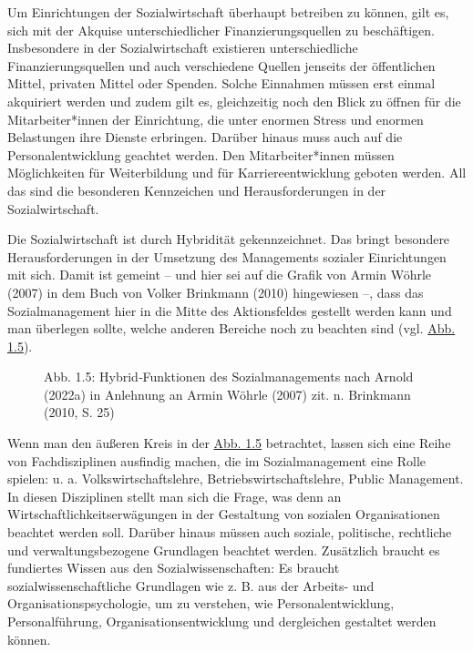 \documentclass[
  letterpaper,
]{book}
\makeatletter
\newcommand*\pandocbounded[1]{%
  \sbox\pandoc@box{#1}%
  \Gscale@div\@tempa{\textheight}{\dimexpr\ht\pandoc@box+\dp\pandoc@box\relax}%
  \Gscale@div\@tempb{\linewidth}{\wd\pandoc@box}%
  \ifdim\@tempb\p@<\@tempa\p@\let\@tempa\@tempb\fi%
  \ifdim\@tempa\p@<\p@\scalebox{\@tempa}{\usebox\pandoc@box}%
  \else\usebox{\pandoc@box}%
  \fi%
}
\makeatother
\begin{document}
Um Einrichtungen der Sozialwirtschaft überhaupt betreiben zu können,
gilt es, sich mit der Akquise unterschiedlicher Finanzierungsquellen zu
beschäftigen. Insbesondere in der Sozialwirtschaft existieren
unterschiedliche Finanzierungsquellen und auch verschiedene Quellen
jenseits der öffentlichen Mittel, privaten Mittel oder Spenden. Solche
Einnahmen müssen erst einmal akquiriert werden und zudem gilt es,
gleichzeitig noch den Blick zu öffnen für die Mitarbeiter*innen der
Einrichtung, die unter enormen Stress und enormen Belastungen ihre
Dienste erbringen. Darüber hinaus muss auch auf die Personalentwicklung
geachtet werden. Den Mitarbeiter*innen müssen Möglichkeiten für
Weiterbildung und für Karriereentwicklung geboten werden. All das sind
die besonderen Kennzeichen und Herausforderungen in der
Sozialwirtschaft.

Die Sozialwirtschaft ist durch Hybridität gekennzeichnet. Das bringt
besondere Herausforderungen in der Umsetzung des Managements sozialer
Einrichtungen mit sich. Damit ist gemeint -- und hier sei auf die Grafik
von Armin Wöhrle (2007) in dem Buch von Volker Brinkmann (2010)
hingewiesen --, dass das Sozialmanagement hier in die Mitte des
Aktionsfeldes gestellt werden kann und man überlegen sollte, welche
anderen Bereiche noch zu beachten sind (vgl. \hyperref[figure15]{Abb.
1.5}).

\begin{figure}

\pandocbounded{\texttt{[image: images/figure15.png]}} \hfill{}

\caption{Abb. 1.5: Hybrid‐Funktionen des Sozialmanagements nach Arnold
(2022a) in Anlehnung an Armin Wöhrle (2007) zit. n. Brinkmann (2010, S.
25)}

\end{figure}%

Wenn man den äußeren Kreis in der \hyperref[figure15]{Abb. 1.5}
betrachtet, lassen sich eine Reihe von Fachdisziplinen ausfindig machen,
die im Sozialmanagement eine Rolle spielen: u. a. Volkswirtschaftslehre,
Betriebswirtschaftslehre, Public Management. In diesen Disziplinen
stellt man sich die Frage, was denn an Wirtschaftlichkeitserwägungen in
der Gestaltung von sozialen Organisationen beachtet werden soll. Darüber
hinaus müssen auch soziale, politische, rechtliche und
verwaltungsbezogene Grundlagen beachtet werden. Zusätzlich braucht es
fundiertes Wissen aus den Sozialwissenschaften: Es braucht
sozialwissenschaftliche Grundlagen wie z. B. aus der Arbeits- und
Organisationspsychologie, um zu verstehen, wie Personalentwicklung,
Personalführung, Organisationsentwicklung und dergleichen gestaltet
werden können.
\end{document}
